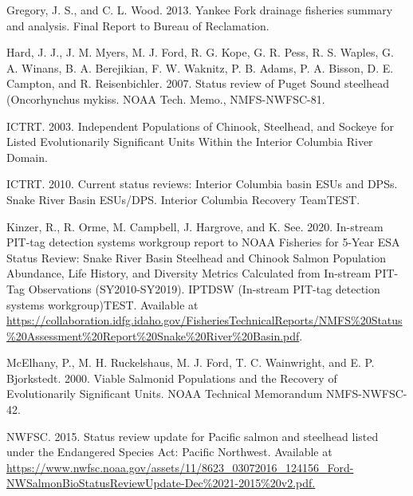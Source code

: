 \documentclass[
  letterpaper,
  oneside,
  open=any]{scrbook}
\newlength{\cslhangindent}
\newlength{\cslentryspacingunit} %
\newenvironment{CSLReferences}[2] %
 {%
  \setlength{\parindent}{0pt}
  \ifodd #1
  \let\oldpar\par
  \def\par{\hangindent=\cslhangindent\oldpar}
  \fi
  \setlength{\parskip}{#2\cslentryspacingunit}
 }%
 {}
\begin{document}
\begin{CSLReferences}{1}{0}
\leavevmode{}%
Gregory, J. S., and C. L. Wood. 2013. Yankee {Fork} drainage fisheries
summary and analysis. {Final} {Report} to {Bureau} of {Reclamation}.

\leavevmode{}%
Hard, J. J., J. M. Myers, M. J. Ford, R. G. Kope, G. R. Pess, R. S.
Waples, G. A. Winans, B. A. Berejikian, F. W. Waknitz, P. B. Adams, P.
A. Bisson, D. E. Campton, and R. Reisenbichler. 2007. Status review of
{Puget} {Sound} steelhead ({Oncorhynchus} mykiss. NOAA Tech. Memo.,
NMFS-NWFSC-81.

\leavevmode{}%
ICTRT. 2003. Independent {Populations} of {Chinook}, {Steelhead}, and
{Sockeye} for {Listed} {Evolutionarily} {Significant} {Units} {Within}
the {Interior} {Columbia} {River} {Domain}.

\leavevmode{}%
ICTRT. 2010. Current status reviews: {Interior} {Columbia} basin {ESUs}
and {DPSs}. Snake River Basin ESUs/DPS. Interior Columbia Recovery
TeamTEST.

\leavevmode{}%
Kinzer, R., R. Orme, M. Campbell, J. Hargrove, and K. See. 2020.
In-stream {PIT}-tag detection systems workgroup report to {NOAA}
{Fisheries} for 5-{Year} {ESA} {Status} {Review}: {Snake} {River}
{Basin} {Steelhead} and {Chinook} {Salmon} {Population} {Abundance},
{Life} {History}, and {Diversity} {Metrics} {Calculated} from
{In}-stream {PIT}-{Tag} {Observations} ({SY2010}-{SY2019}). IPTDSW
(In-stream PIT-tag detection systems workgroup)TEST. Available at
\url{https://collaboration.idfg.idaho.gov/FisheriesTechnicalReports/NMFS\%20Status\%20Assessment\%20Report\%20Snake\%20River\%20Basin.pdf}.

\leavevmode{}%
McElhany, P., M. H. Ruckelshaus, M. J. Ford, T. C. Wainwright, and E. P.
Bjorkstedt. 2000. Viable {Salmonid} {Populations} and the {Recovery} of
{Evolutionarily} {Significant} {Units}. NOAA Technical Memorandum
NMFS-NWFSC-42.

\leavevmode{}%
NWFSC. 2015. Status review update for {Pacific} salmon and steelhead
listed under the {Endangered} {Species} {Act}: {Pacific} {Northwest}.
Available at
\url{https://www.nwfsc.noaa.gov/assets/11/8623_03072016_124156_Ford-NWSalmonBioStatusReviewUpdate-Dec\%2021-2015\%20v2.pdf.}


\end{CSLReferences}
\end{document}
